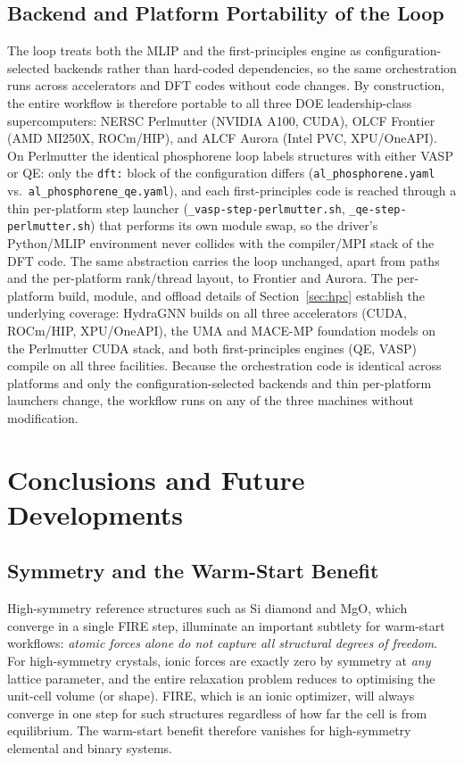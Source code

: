 \documentclass[conference]{IEEEtran}
\def\acs#1{#1}%
\begin{document}
\subsection{Backend and Platform Portability of the Loop}
\label{sec:results:portability}
The loop treats both the \acs{MLIP} and the first-principles engine as
configuration-selected backends rather than hard-coded dependencies, so the
same orchestration runs across accelerators and \acs{DFT} codes without code
changes. By construction, the entire workflow is therefore portable to all
three \acs{DOE} leadership-class supercomputers: \acs{NERSC} Perlmutter
(NVIDIA A100, \acs{CUDA}), \acs{OLCF} Frontier (AMD MI250X, ROCm/HIP), and
\acs{ALCF} Aurora (Intel \acs{PVC}, \acs{XPU}/OneAPI). On Perlmutter the
identical phosphorene loop labels structures with either \acs{VASP} or \acs{QE}:
only the \texttt{dft:} block of the configuration differs
(\texttt{al\_phosphorene.yaml} vs.\ \texttt{al\_phosphorene\_qe.yaml}), and each
first-principles code is reached through a thin per-platform step launcher
(\texttt{\_vasp-step-perlmutter.sh}, \texttt{\_qe-step-perlmutter.sh}) that
performs its own module swap, so the driver's Python/\acs{MLIP} environment
never collides with the compiler/\acs{MPI} stack of the \acs{DFT} code. The same
abstraction carries the loop unchanged, apart from paths and the per-platform
rank/thread layout, to Frontier and Aurora. The per-platform build, module, and
offload details of Section~\ref{sec:hpc} establish the underlying coverage:
HydraGNN builds on all three accelerators (\acs{CUDA}, ROCm/HIP,
\acs{XPU}/OneAPI), the UMA and MACE-MP foundation models on the Perlmutter
\acs{CUDA} stack, and both first-principles engines (\acs{QE}, \acs{VASP})
compile on all three facilities. Because the orchestration code is identical
across platforms and only the configuration-selected backends and thin
per-platform launchers change, the workflow runs on any of the three machines
without modification.

\section{Conclusions and Future Developments}
\label{sec:conclusions}

\subsection{Symmetry and the Warm-Start Benefit}
High-symmetry reference structures such as Si diamond and MgO, which converge
in a single \acs{FIRE} step, illuminate an important
subtlety for warm-start workflows: \emph{atomic forces alone do not capture all
structural degrees of
freedom}. For high-symmetry crystals, ionic forces are exactly zero by symmetry
at \emph{any} lattice parameter, and the entire relaxation problem reduces to
optimising the unit-cell volume (or shape). \acs{FIRE}, which is an ionic optimizer,
will always converge in one step for such structures regardless of how far
the cell is from equilibrium. The warm-start benefit therefore vanishes for
high-symmetry elemental and binary systems.
\end{document}
